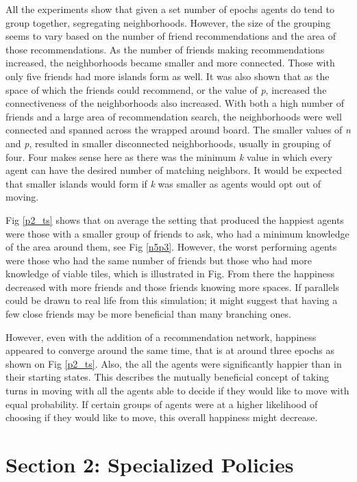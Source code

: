 \documentclass[11pt]{article}
\begin{document}
	All the experiments show that given a set number of epochs agents do tend to group together, segregating neighborhoods. However, the size of the grouping seems to vary based on the number of friend recommendations and the area of those recommendations. As the number of friends making recommendations increased, the neighborhoods became smaller and more connected. Those with only five friends had more islands form as well. It was also shown that as the space of which the friends could recommend, or the value of \textit{p}, increased the connectiveness of the neighborhoods also increased. With both a high number of friends and a large area of recommendation search, the neighborhoods were well connected and spanned across the wrapped around board. The smaller values of \textit{n} and \textit{p}, resulted in smaller disconnected neighborhoods, usually in grouping of four. Four makes sense here as there was the minimum \textit{k} value in which every agent can have the desired number of matching neighbors. It would be expected that smaller islands would form if \textit{k} was smaller as agents would opt out of moving. \par
	Fig \ref{p2_ts} shows that on average the setting that produced the happiest agents were those with a smaller group of friends to ask, who had a minimum knowledge of the area around them, see Fig \ref{n5p3}. However, the worst performing agents were those who had the same number of friends but those who had more knowledge of viable tiles, which is illustrated in Fig. From there the happiness decreased with more friends and those friends knowing more spaces. If parallels could be drawn to real life from this simulation; it might suggest that having a few close friends may be more beneficial than many branching ones. \par
	However, even with the addition of a recommendation network, happiness appeared to converge around the same time, that is at around three epochs as shown on Fig \ref{p2_ts}. Also, the all the agents were significantly happier than in their starting states. This describes the mutually beneficial concept of taking turns in moving with all the agents able to decide if they would like to move with equal probability. If certain groups of agents were at a higher likelihood of choosing if they would like to move, this overall happiness might decrease. 
	


	\newpage
	\section{Section 2: Specialized Policies}
\end{document}
